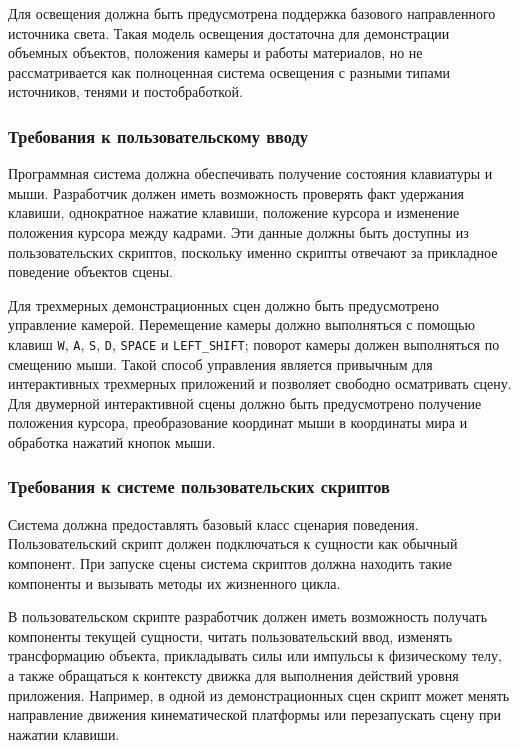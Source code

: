 Для освещения должна быть предусмотрена поддержка базового направленного источника света. Такая модель освещения достаточна для демонстрации объемных объектов, положения камеры и работы материалов, но не рассматривается как полноценная система освещения с разными типами источников, тенями и постобработкой.

\subsubsection{Требования к пользовательскому вводу}

Программная система должна обеспечивать получение состояния клавиатуры и мыши. Разработчик должен иметь возможность проверять факт удержания клавиши, однократное нажатие клавиши, положение курсора и изменение положения курсора между кадрами. Эти данные должны быть доступны из пользовательских скриптов, поскольку именно скрипты отвечают за прикладное поведение объектов сцены.

Для трехмерных демонстрационных сцен должно быть предусмотрено управление камерой. Перемещение камеры должно выполняться с помощью клавиш \texttt{W}, \texttt{A}, \texttt{S}, \texttt{D}, \texttt{SPACE} и \texttt{LEFT\_SHIFT}; поворот камеры должен выполняться по смещению мыши. Такой способ управления является привычным для интерактивных трехмерных приложений и позволяет свободно осматривать сцену. Для двумерной интерактивной сцены должно быть предусмотрено получение положения курсора, преобразование координат мыши в координаты мира и обработка нажатий кнопок мыши.

\subsubsection{Требования к системе пользовательских скриптов}

Система должна предоставлять базовый класс сценария поведения. Пользовательский скрипт должен подключаться к сущности как обычный компонент. При запуске сцены система скриптов должна находить такие компоненты и вызывать методы их жизненного цикла.

В пользовательском скрипте разработчик должен иметь возможность получать компоненты текущей сущности, читать пользовательский ввод, изменять трансформацию объекта, прикладывать силы или импульсы к физическому телу, а также обращаться к контексту движка для выполнения действий уровня приложения. Например, в одной из демонстрационных сцен скрипт может менять направление движения кинематической платформы или перезапускать сцену при нажатии клавиши.

